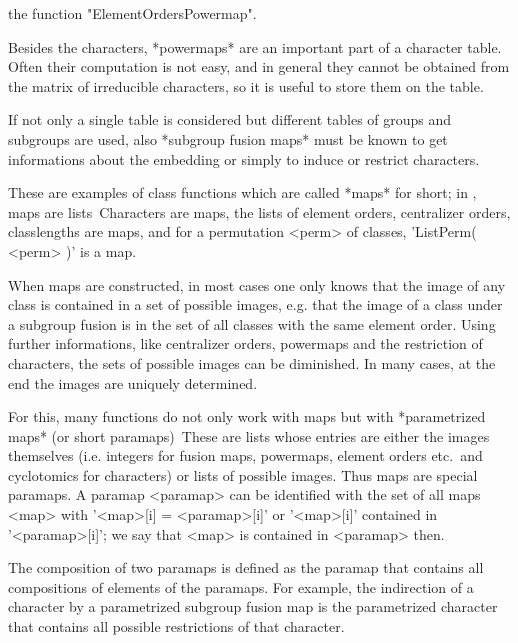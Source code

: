 the function "ElementOrdersPowermap".


Besides the characters, *powermaps* are an important part of a character
table. Often their computation is not easy, and in general they cannot be
obtained from the matrix of irreducible characters, so it is useful to store
them on the table.

If not only a single table is considered but different tables of groups
and subgroups are used, also *subgroup fusion maps* must be known to get
informations about the embedding or simply to induce or restrict characters.

These are examples of class functions which are called *maps* for short;
in \GAP, maps are lists\:\ Characters are maps, the lists of element orders,
centralizer orders, classlengths are maps, and for a permutation <perm> of
classes, 'ListPerm( <perm> )' is a map.

When maps are constructed, in most cases one only knows that the image of
any class is contained in a set of possible images, e.g. that the image of
a class under a subgroup fusion is in the set of all classes with the same
element order. Using further informations, like centralizer orders, powermaps
and the restriction of characters, the sets of possible images can be
diminished. In many cases, at the end the images are uniquely determined.

For this, many functions do not only work with maps but with
*parametrized maps* (or short paramaps)\:\ These are lists whose entries are
either the images themselves (i.e. integers for fusion maps, powermaps,
element orders etc.\ and cyclotomics for characters) or lists of possible
images. Thus maps are special paramaps. A paramap <paramap> can be
identified with the set of all maps <map> with '<map>[i] = <paramap>[i]'
or '<map>[i]' contained in '<paramap>[i]'; we say that <map> is contained
in <paramap> then.

The composition of two paramaps is defined as the paramap that contains all
compositions of elements of the paramaps. For example, the indirection of
a character by a parametrized subgroup fusion map is the parametrized
character that contains all possible restrictions of that character.


